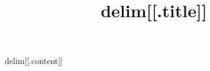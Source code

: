 \documentclass{scrartcl}
\title{delim[[.title]]}
\begin{document}
\maketitle
delim[[.content]]
\end{document}
